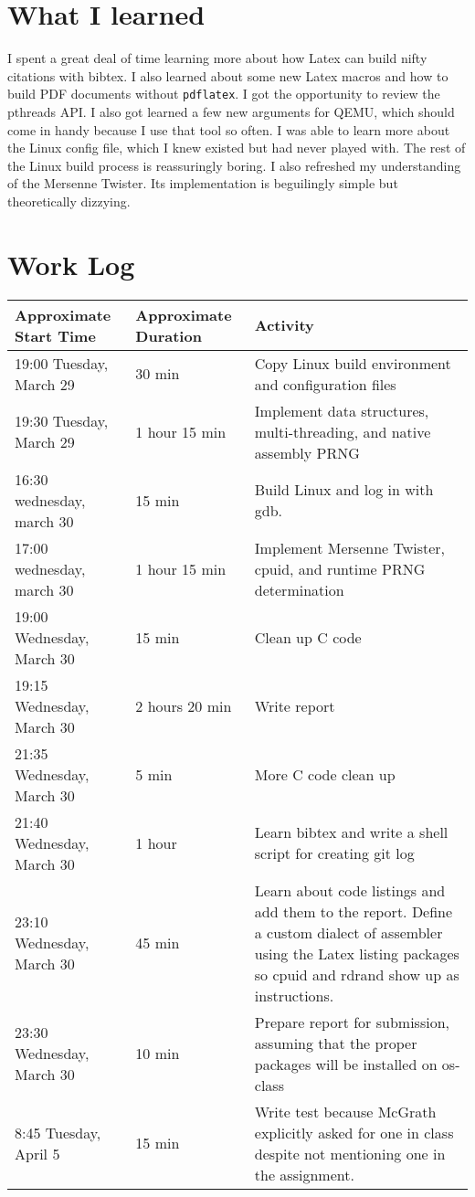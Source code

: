 \documentclass[10pt,conference,draftclsnofoot,onecolumn]{IEEEtran}
\begin{document}
\section{What I learned}
I spent a great deal of time learning more about how Latex can build nifty citations with bibtex. I also learned about some new Latex macros and how to build PDF documents without \texttt{pdflatex}. I got the opportunity to review the pthreads API. I also got learned a few new arguments for QEMU, which should come in handy because I use that tool so often. I was able to learn more about the Linux config file, which I knew existed but had never played with. The rest of the Linux build process is reassuringly boring. I also refreshed my understanding of the Mersenne Twister. Its implementation is beguilingly simple but theoretically dizzying.


\section{Work Log}
\begin{tabular}{|p{5cm}|p{5cm}|p{5cm}}
    \textbf{Approximate Start Time} & \textbf{Approximate Duration} & \textbf{Activity} \\
    \hline
    19:00 Tuesday, March 29 & 30 min & Copy Linux build environment and configuration files \\
    19:30 Tuesday, March 29 & 1 hour 15 min & Implement data structures, multi-threading, and native assembly PRNG \\
    16:30 wednesday, march 30 & 15 min & Build Linux and log in with gdb. \\
    17:00 wednesday, march 30 & 1 hour 15 min & Implement Mersenne Twister, cpuid, and runtime PRNG determination \\
    19:00 Wednesday, March 30 & 15 min & Clean up C code \\
    19:15 Wednesday, March 30 & 2 hours 20 min & Write report \\
    21:35 Wednesday, March 30 & 5 min & More C code clean up \\
    21:40 Wednesday, March 30 & 1 hour & Learn bibtex and write a shell script for creating git log \\
    23:10 Wednesday, March 30 & 45 min & Learn about code listings and add them to the report. Define a custom dialect of assembler using the Latex listing packages so cpuid and rdrand show up as instructions. \\
    23:30 Wednesday, March 30 & 10 min & Prepare report for submission, assuming that the proper packages will be installed on os-class \\
    8:45 Tuesday, April 5 & 15 min & Write test because McGrath explicitly asked for one in class despite not mentioning one in the assignment.
\end{tabular}
\end{document}
